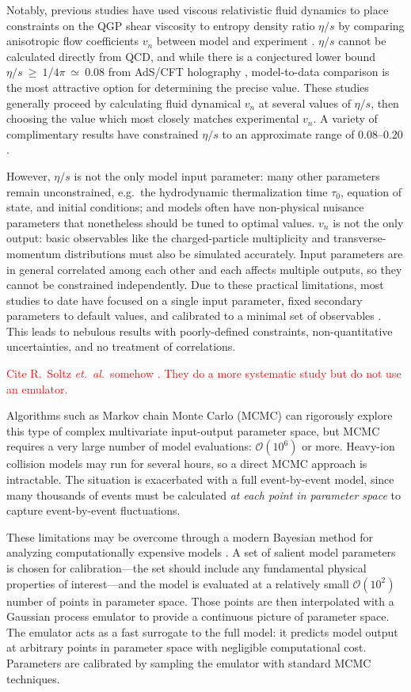\documentclass[aps,prc,reprint,amsmath]{revtex4-1}
\newcommand{\todo}[1]{\textcolor{red}{#1}}
\begin{document}
Notably, previous studies have used viscous relativistic fluid dynamics to place constraints on the QGP shear viscosity to entropy density ratio $\eta/s$ by comparing anisotropic flow coefficients $v_n$ between model and experiment \cite{}.
$\eta/s$ cannot be calculated directly from QCD, and while there is a conjectured lower bound $\eta/s~\geq~1/4\pi~\simeq~0.08$ from AdS/CFT holography \cite{}, model-to-data comparison is the most attractive option for determining the precise value.
These studies generally proceed by calculating fluid dynamical $v_n$ at several values of $\eta/s$, then choosing the value which most closely matches experimental $v_n$.
A variety of complimentary results have constrained $\eta/s$ to an approximate range of 0.08--0.20 \cite{}.

However, $\eta/s$ is not the only model input parameter:
many other parameters remain unconstrained, e.g.~the hydrodynamic thermalization time $\tau_0$, equation of state, and initial conditions; and models often have non-physical nuisance parameters that nonetheless should be tuned to optimal values.
$v_n$ is not the only output:
basic observables like the charged-particle multiplicity and transverse-momentum distributions must also be simulated accurately.
Input parameters are in general correlated among each other and each affects multiple outputs, so they cannot be constrained independently.
Due to these practical limitations, most studies to date have focused on a single input parameter, fixed secondary parameters to default values, and calibrated to a minimal set of observables \cite{}.
This leads to nebulous results with poorly-defined constraints, non-quantitative uncertainties, and no treatment of correlations.

\todo{
  Cite R.~Soltz \emph{et.~al.}\ somehow \cite{Soltz:2012rk}.
  They do a more systematic study but do not use an emulator.
}

Algorithms such as Markov chain Monte Carlo (MCMC) can rigorously explore this type of complex multivariate input-output parameter space, but MCMC requires a very large number of model evaluations: $\mathcal O(10^6)$ or more.
Heavy-ion collision models may run for several hours, so a direct MCMC approach is intractable.
The situation is exacerbated with a full event-by-event model, since many thousands of events must be calculated \emph{at each point in parameter space} to capture event-by-event fluctuations.

These limitations may be overcome through a modern Bayesian method for analyzing computationally expensive models \cite{OHagan:2006ba,Higdon:2008cmc,Higdon:2014tva}.
A set of salient model parameters is chosen for calibration---the set should include any fundamental physical properties of interest---and the model is evaluated at a relatively small $\mathcal O(10^2)$ number of points in parameter space.
Those points are then interpolated with a Gaussian process emulator \cite{Rasmussen:2006gp} to provide a continuous picture of parameter space.
The emulator acts as a fast surrogate to the full model:
it predicts model output at arbitrary points in parameter space with negligible computational cost.
Parameters are calibrated by sampling the emulator with standard MCMC techniques.
\end{document}
